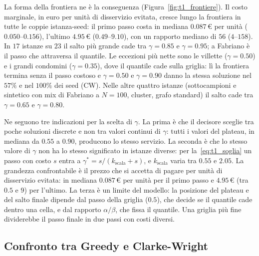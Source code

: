 La forma della frontiera ne è la conseguenza (Figura~\ref{fig:t1_frontiere}). Il costo marginale, in euro per unità di disservizio evitata, cresce lungo la frontiera in tutte le coppie istanza-seed: il primo passo costa in mediana $0.087$\,\euro{} per unità ($0.050$--$0.156$), l'ultimo $4.95$\,\euro{} ($0.49$--$9.10$), con un rapporto mediano di $56$ ($4$--$158$). In $17$ istanze su $23$ il salto più grande cade tra $\gamma=0.85$ e $\gamma=0.95$; a Fabriano è il passo che attraversa il quantile. Le eccezioni più nette sono le villette ($\gamma=0.50$) e i grandi condomini ($\gamma=0.35$), dove il quantile cade sulla griglia: lì la frontiera termina senza il passo costoso e $\gamma=0.50$ e $\gamma=0.90$ danno la stessa soluzione nel $57\%$ e nel $100\%$ dei seed (CW). Nelle altre quattro istanze (sottocampioni e sintetico con mix di Fabriano a $N=100$, cluster, grafo standard) il salto cade tra $\gamma=0.65$ e $\gamma=0.80$.

Ne seguono tre indicazioni per la scelta di $\gamma$. La prima è che il decisore sceglie tra poche soluzioni discrete e non tra valori continui di $\gamma$: tutti i valori del plateau, in mediana da $0.55$ a $0.90$, producono lo stesso servizio. La seconda è che lo stesso valore di $\gamma$ non ha lo stesso significato in istanze diverse: per la~\eqref{eq:t1_soglia} un passo con costo $s$ entra a $\gamma^*=s/(k_{\mathrm{scala}}+s)$, e $k_{\mathrm{scala}}$ varia tra $0.55$ e $2.05$. La grandezza confrontabile è il prezzo che si accetta di pagare per unità di disservizio evitata: in mediana $0.087$\,\euro{} per unità per il primo passo e $4.95$\,\euro{} (tra $0.5$ e $9$) per l'ultimo. La terza è un limite del modello: la posizione del plateau e del salto finale dipende dal passo della griglia ($0.5$), che decide se il quantile cade dentro una cella, e dal rapporto $\alpha/\beta$, che fissa il quantile. Una griglia più fine dividerebbe il passo finale in due passi con costi diversi.

\subsection{Confronto tra Greedy e Clarke-Wright}\label{sse:t1-algoritmi}

